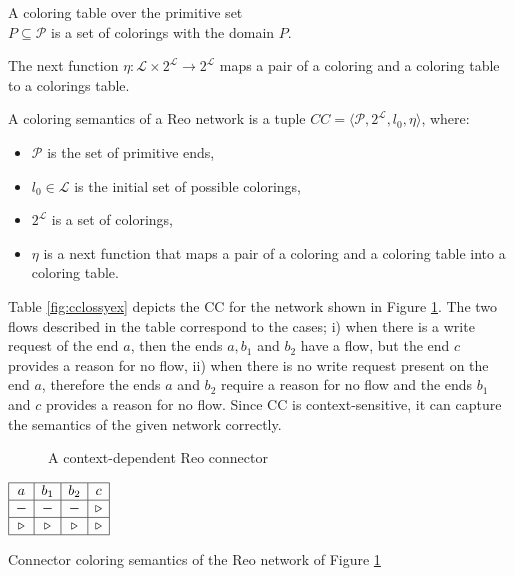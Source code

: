 \begin{definition}
A coloring table over the primitive set \\ $P \subseteq \mathcal{P}$ is a set of colorings with the domain $P$.
\end{definition}

 \begin{definition}
The next function $\eta : \mathcal{L} \times 2^{\mathcal{L}} \rightarrow 2^\mathcal{L}$ maps a pair of a coloring and a coloring table to a colorings table. %
\end{definition}

\begin{definition}
A coloring semantics of a Reo network is a tuple $CC = \langle \mathcal{P}, 2^\mathcal{L}, l_0, \eta \rangle$, where:
\begin{itemize}
 \item $\mathcal{P}$ is the set of primitive ends,
 \item $l_0 \in \mathcal{L}$ is the initial set of possible colorings,
 \item $2^\mathcal{L}$ is a set of colorings,
 \item $\eta$ is a next function that maps a pair of a coloring and a coloring table into a coloring table.
\end{itemize}
\end{definition}


\begin{BehExample}
\label{ex:contextsenchapter}
	Table \ref{fig:cclossyex} depicts the CC for the network shown in Figure \ref{fig:lossyfifoforcc}. The two flows described in the table correspond to the cases; i) when there is a write request of the end $a$, then the ends $a, b_1$ and $b_2$ have a flow, but the end $c$ provides a reason for no flow, ii) when there is no write request present on the end $a$, therefore the ends $a$ and $b_2$ require a reason for no flow and the ends $b_1$ and $c$ provides a reason for no flow. Since CC is context-sensitive, it can capture the semantics of the given network correctly.

\begin{figure}[!h]
    \mesallossyfif    
    \caption{A context-dependent Reo connector}
    \label{fig:lossyfifoforcc}
\end{figure}      

\begin{table}[!h]
    $ \begin{array}{|c|c|c|c|} \hline a & b_1 & b_2 &c \\ \hline
  - & - & - & \triangleright \\ \hline
      \triangleright & \triangleright & \triangleright & \triangleright\\ \hline
       \end{array}$ 
    \vspace{.5cm}
    \caption{Connector coloring semantics of the Reo network of Figure \ref{fig:lossyfifoforcc}}
    \label{fig:cclossyex}
\end{table}
\end{BehExample}

